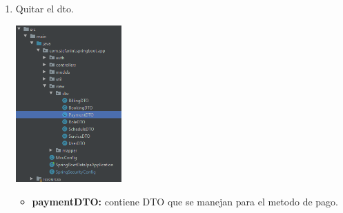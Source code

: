 \documentclass[10pt,a4paper,openany]{book}
\begin{document}
\begin{enumerate}
\item Quitar el dto.\\
\begin{center}
\includegraphics[width=0.32\textwidth]{conBk3}
\end{center}
\begin{itemize}
	\item \textbf{paymentDTO:} contiene DTO que se manejan para el metodo de pago.
\end{itemize}
\end{enumerate}
\end{document}
